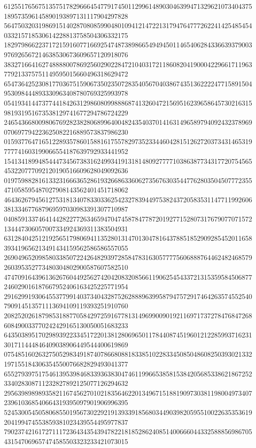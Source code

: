 \begin{DoxyCode}
      612551765675135751782966645477917450112996148903046399471329621073404375189573596145890193897131117904297828
      564750320319869151402870808599048010941214722131794764777262241425485454033215718530614228813758504306332175
      182979866223717215916077166925474873898665494945011465406284336639379003976926567214638530673609657120918076
      383271664162748888007869256029022847210403172118608204190004229661711963779213375751149595015660496318629472
      654736425230817703675159067350235072835405670403867435136222247715891504953098444893330963408780769325993978
      054193414473774418426312986080998886874132604721569516239658645730216315981931951673538129741677294786724229
      246543668009806769282382806899640048243540370141631496589794092432378969070697794223625082216889573837986230
      015937764716512289357860158816175578297352334460428151262720373431465319777741603199066554187639792933441952
      154134189948544473456738316249934191318148092777710386387734317720754565453220777092120190516609628049092636
      019759882816133231666365286193266863360627356763035447762803504507772355471058595487027908143562401451718062
      464362679456127531813407833033625423278394497538243720583531147711992606381334677687969597030983391307710987
      040859133746414428227726346594704745878477872019277152807317679077071572134447306057007334924369311383504931
      631284042512192565179806941135280131470130478164378851852909285452011658393419656213491434159562586586557055
      269049652098580338507224264829397285847831630577775606888764462482468579260395352773480304802900587607582510
      474709164396136267604492562742042083208566119062545433721315359584506877246029016187667952406163425225771954
      291629919306455377991403734043287526288896399587947572917464263574552540790914513571113694109119393251910760
      208252026187985318877058429725916778131496990090192116971737278476847268608490033770242429165130050051683233
      643503895170298939223345172201381280696501178440874519601212285993716231301711444846409038906449544400619869
      075485160263275052983491874078668088183385102283345085048608250393021332197155184306354550076682829493041377
      655279397517546139539846833936383047461199665385815384205685338621867252334028308711232827892125077126294632
      295639898989358211674562701021835646220134967151881909730381198004973407239610368540664319395097901906996395
      524530054505806855019567302292191393391856803449039820595510022635353619204199474553859381023439554495977837
      790237421617271117236434354394782218185286240851400666044332588856986705431547069657474585503323233421073015

\end{DoxyCode}
